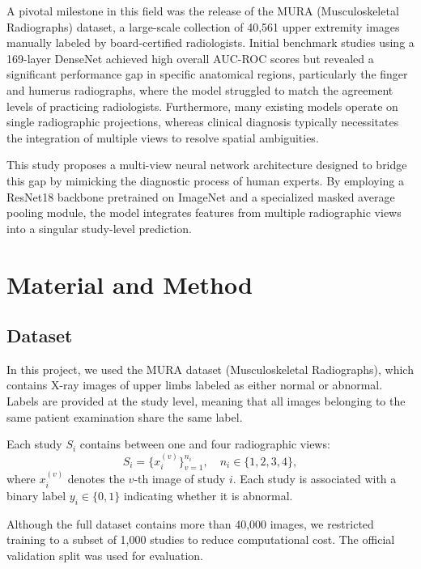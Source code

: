 \documentclass[12pt,a4paper]{article}
\begin{document}
A pivotal milestone in this field was the release of the MURA (Musculoskeletal Radiographs) dataset, a large-scale collection of 40,561 upper extremity images manually labeled by board-certified radiologists\cite{rajpurkar_mura_2018}. Initial benchmark studies using a 169-layer DenseNet achieved high overall AUC-ROC scores but revealed a significant performance gap in specific anatomical regions, particularly the finger and humerus radiographs, where the model struggled to match the agreement levels of practicing radiologists. Furthermore, many existing models operate on single radiographic projections, whereas clinical diagnosis typically necessitates the integration of multiple views to resolve spatial ambiguities\cite{rajpurkar_mura_2018,dangelo_artificial_2022}.

This study proposes a multi-view neural network architecture designed to bridge this gap by mimicking the diagnostic process of human experts. By employing a ResNet18 backbone pretrained on ImageNet\cite{he_deep_2016} and a specialized masked average pooling module, the model integrates features from multiple radiographic views into a singular study-level prediction.


\section{Material and Method}
\label{sec:material-method}

\subsection{Dataset}

In this project, we used the MURA dataset (Musculoskeletal Radiographs), which contains X-ray images of upper limbs labeled as either normal or abnormal\cite{rajpurkar_mura_2018}. Labels are provided at the study level, meaning that all images belonging to the same patient examination share the same label.

Each study $S_i$ contains between one and four radiographic views:
\begin{equation}
S_i = \{ x_i^{(v)} \}_{v=1}^{n_i}, \quad n_i \in \{1,2,3,4\},
\end{equation}
where $x_i^{(v)}$ denotes the $v$-th image of study $i$. Each study is associated with a binary label $y_i \in \{0,1\}$ indicating whether it is abnormal.

Although the full dataset contains more than 40,000 images, we restricted training to a subset of 1,000 studies to reduce computational cost. The official validation split was used for evaluation.
\end{document}
